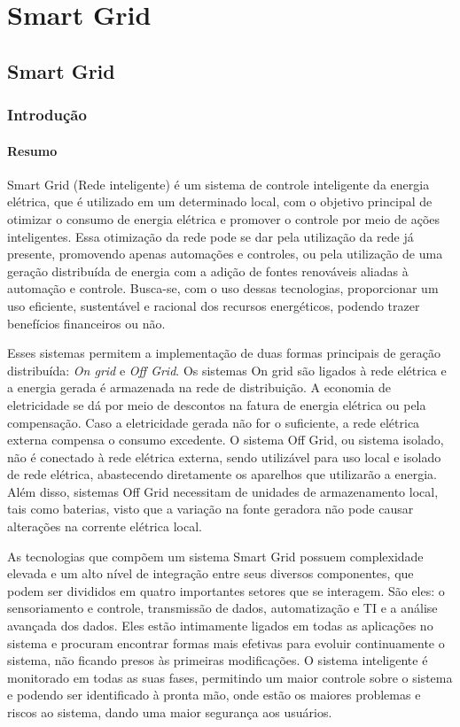 \part{Smart Grid}
\chapter[Smart Grid]{Smart Grid}

\section{Introdução}

\subsection{Resumo}
Smart Grid (Rede inteligente) é um sistema de controle inteligente da energia elétrica, que é utilizado em um determinado local, com o objetivo principal de otimizar o consumo de energia elétrica e promover o controle por meio de ações inteligentes. Essa otimização da rede pode se dar pela utilização da rede já presente, promovendo apenas automações e controles, ou pela utilização de uma geração distribuída de energia com a adição de fontes renováveis aliadas à automação e controle. Busca-se, com o uso dessas tecnologias, proporcionar um uso eficiente, sustentável e racional dos recursos energéticos, podendo trazer benefícios financeiros ou não.

Esses sistemas permitem a implementação de duas formas principais de geração distribuída: \textit{On grid} e \textit{Off Grid}. Os sistemas On grid são ligados à rede elétrica e a energia gerada é armazenada na rede de distribuição. A economia de eletricidade se dá por meio de descontos na fatura de energia elétrica ou pela compensação. Caso a eletricidade gerada não for o suficiente, a rede elétrica externa compensa o consumo excedente. O sistema Off Grid, ou sistema isolado, não é conectado à rede elétrica externa, sendo utilizável para uso local e isolado de rede elétrica, abastecendo diretamente os aparelhos que utilizarão a energia. Além disso, sistemas Off Grid necessitam de unidades de armazenamento local, tais como baterias, visto que a variação na fonte geradora não pode causar alterações na corrente elétrica local. 

As tecnologias que compõem um sistema Smart Grid possuem complexidade elevada e um alto nível de integração entre seus diversos componentes, que podem ser divididos em quatro importantes setores que se interagem. São eles: o sensoriamento e controle, transmissão de dados, automatização e TI e a análise avançada dos dados. Eles estão intimamente ligados em todas as aplicações no sistema e procuram encontrar formas mais efetivas para evoluir continuamente o sistema, não ficando presos às primeiras modificações. O sistema inteligente é monitorado em todas as suas fases, permitindo um maior controle sobre o sistema e podendo ser identificado à pronta mão, onde estão os maiores problemas e riscos ao sistema, dando uma maior segurança aos usuários.


